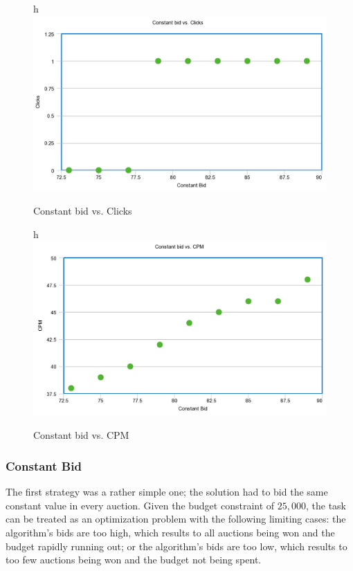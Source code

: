 \documentclass{sig-alternate-05-2015}
\begin{document}
\begin{figure}{h}
  \includegraphics[width=\linewidth]{click.png}
  \caption{Constant bid vs. Clicks}
  \label{fig:clicks}
\end{figure}

\begin{figure}{h}
  \includegraphics[width=\linewidth]{CPM.png}
  \caption{Constant bid vs. CPM}
  \label{fig:CPM}
\end{figure}

\subsubsection{Constant Bid}
The first strategy was a rather simple one; the solution had to bid the same constant value in every auction. Given the budget constraint of $25,000$, the task can be treated as an optimization problem with the following limiting cases: the algorithm's bids are too high, which results to all auctions being won and the budget rapidly running out; or the algorithm's bids are too low, which results to too few auctions being won and the budget not being spent.
\end{document}
